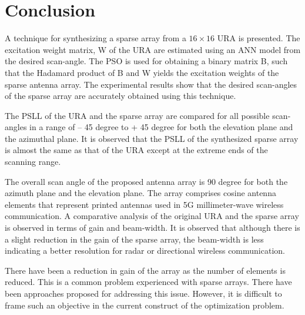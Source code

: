 \section{Conclusion} \label{c5sec_cncl}
A technique for synthesizing a sparse array from a $16\times 16$ URA is presented. The excitation weight matrix, W of the URA are estimated using an ANN model from the desired scan-angle. The PSO is used for obtaining a binary matrix B, such that the Hadamard product of B and W yields the excitation weights of the sparse antenna array. The experimental results show that the desired scan-angles of the sparse array are accurately obtained using this technique.

The PSLL of the URA and the sparse array are compared for all possible scan-angles in a range of -- 45 degree to + 45 degree for both the elevation plane and the azimuthal plane. It is observed that the PSLL of the synthesized sparse array is almost the same as that of the URA except at the extreme ends of the scanning range.

The overall scan angle of the proposed antenna array is 90 degree for both the azimuth plane and the elevation plane. The array comprises cosine antenna elements that represent printed antennas used in 5G millimeter-wave wireless communication. A comparative analysis of the original URA and the sparse array is observed in terms of gain and beam-width. It is observed that although there is a slight reduction in the gain of the sparse array, the beam-width is less indicating a better resolution for radar or directional wireless communication.

There have been a reduction in gain of the array as the number of elements is reduced. This is a common problem experienced with sparse arrays. There have been approaches proposed for addressing this issue. However, it is difficult to frame such an objective in the current construct of the optimization problem.
